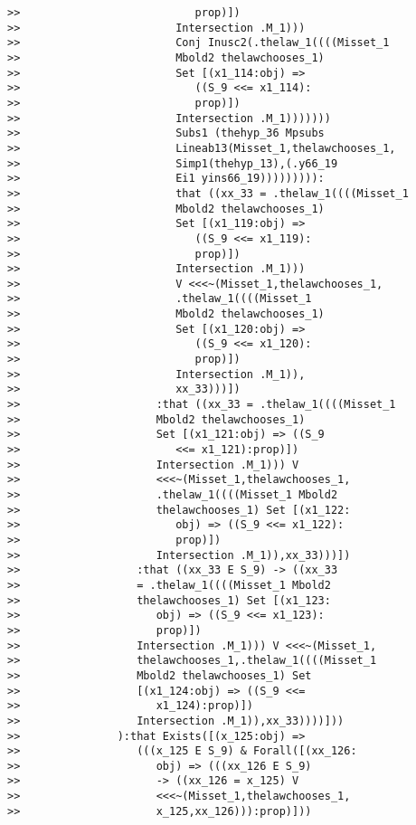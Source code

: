 \documentclass[12pt]{article}
\begin{document}
\begin{verbatim}
>>                           prop)])
>>                        Intersection .M_1)))
>>                        Conj Inusc2(.thelaw_1((((Misset_1
>>                        Mbold2 thelawchooses_1)
>>                        Set [(x1_114:obj) =>
>>                           ((S_9 <<= x1_114):
>>                           prop)])
>>                        Intersection .M_1)))))))
>>                        Subs1 (thehyp_36 Mpsubs
>>                        Lineab13(Misset_1,thelawchooses_1,
>>                        Simp1(thehyp_13),(.y66_19
>>                        Ei1 yins66_19))))))))):
>>                        that ((xx_33 = .thelaw_1((((Misset_1
>>                        Mbold2 thelawchooses_1)
>>                        Set [(x1_119:obj) =>
>>                           ((S_9 <<= x1_119):
>>                           prop)])
>>                        Intersection .M_1)))
>>                        V <<<~(Misset_1,thelawchooses_1,
>>                        .thelaw_1((((Misset_1
>>                        Mbold2 thelawchooses_1)
>>                        Set [(x1_120:obj) =>
>>                           ((S_9 <<= x1_120):
>>                           prop)])
>>                        Intersection .M_1)),
>>                        xx_33)))])
>>                     :that ((xx_33 = .thelaw_1((((Misset_1
>>                     Mbold2 thelawchooses_1)
>>                     Set [(x1_121:obj) => ((S_9
>>                        <<= x1_121):prop)])
>>                     Intersection .M_1))) V
>>                     <<<~(Misset_1,thelawchooses_1,
>>                     .thelaw_1((((Misset_1 Mbold2
>>                     thelawchooses_1) Set [(x1_122:
>>                        obj) => ((S_9 <<= x1_122):
>>                        prop)])
>>                     Intersection .M_1)),xx_33)))])
>>                  :that ((xx_33 E S_9) -> ((xx_33
>>                  = .thelaw_1((((Misset_1 Mbold2
>>                  thelawchooses_1) Set [(x1_123:
>>                     obj) => ((S_9 <<= x1_123):
>>                     prop)])
>>                  Intersection .M_1))) V <<<~(Misset_1,
>>                  thelawchooses_1,.thelaw_1((((Misset_1
>>                  Mbold2 thelawchooses_1) Set
>>                  [(x1_124:obj) => ((S_9 <<=
>>                     x1_124):prop)])
>>                  Intersection .M_1)),xx_33))))]))
>>               ):that Exists([(x_125:obj) =>
>>                  (((x_125 E S_9) & Forall([(xx_126:
>>                     obj) => (((xx_126 E S_9)
>>                     -> ((xx_126 = x_125) V
>>                     <<<~(Misset_1,thelawchooses_1,
>>                     x_125,xx_126))):prop)]))

\end{verbatim}
\end{document}
